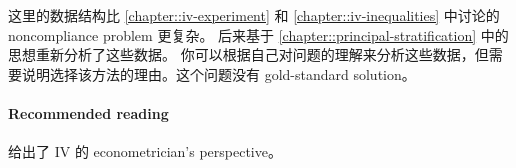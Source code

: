这里的数据结构比 \cref{chapter::iv-experiment} 和 \cref{chapter::iv-inequalities} 中讨论的 noncompliance problem 更复杂。
\citet{jin2008principal} 后来基于 \cref{chapter::principal-stratification} 中的思想重新分析了这些数据。
你可以根据自己对问题的理解来分析这些数据，但需要说明选择该方法的理由。这个问题没有 gold-standard solution。 




 \paragraph{Recommended reading}


\citet{imbens2014instrumental} 给出了 IV 的 econometrician's perspective。 
